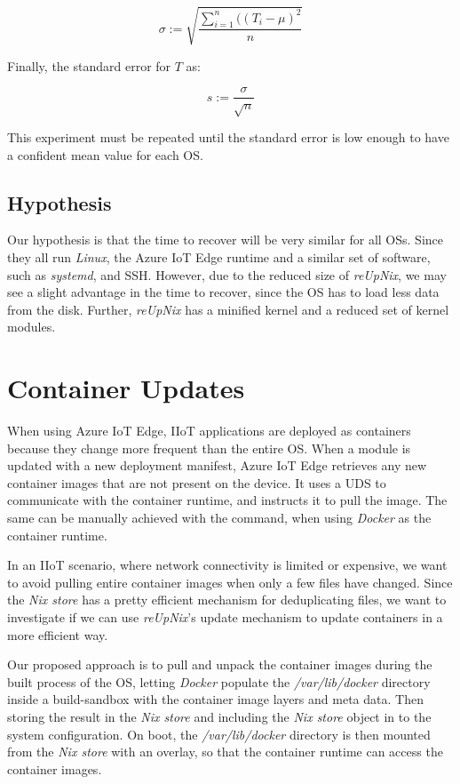 \begin{equation}
   \sigma := \sqrt{\frac{\sum_{i=1}^{n}((T_i - \mu)^2}{n}}
\end{equation}

\noindent
Finally, the standard error for $T$ as:

\begin{equation}
    s := \frac{\sigma}{\sqrt{n}}
\end{equation}

\noindent
This experiment must be repeated until the standard error is low enough
to have a confident mean value for each \ac{OS}.

\subsection{Hypothesis}
Our hypothesis is that the time to recover will be very similar for all
\ac{OS}s. Since they all run \textit{Linux}, the Azure IoT Edge runtime and
a similar set of software, such as \textit{systemd}, and \ac{SSH}. However, due
to the reduced size of \textit{reUpNix}, we may see a slight advantage in the
time to recover, since the \ac{OS} has to load less data from the disk. Further,
\textit{reUpNix} has a minified kernel and a reduced set of kernel modules.

\section{Container Updates}
\label{sec:container-updates}
When using Azure IoT Edge, \ac{IIoT} applications are deployed as containers because
they change more frequent than the entire \ac{OS}. When a module is updated
with a new deployment manifest, Azure IoT Edge retrieves any new container
images that are not present on the device. It uses a \ac{UDS} to communicate
with the container runtime, and instructs it to pull the image. The same can be
manually achieved with the  command, when using \textit{Docker}
as the container runtime.

In an \ac{IIoT} scenario, where network connectivity is limited or expensive,
we want to avoid pulling entire container images when only a few files have
changed. Since the \textit{Nix store} has a pretty efficient mechanism for
deduplicating files, we want to investigate if we can use \textit{reUpNix}'s
update mechanism to update containers in a more efficient way.

Our proposed approach is to pull and unpack the container images during the built
process of the \ac{OS}, letting \textit{Docker} populate the \textit{/var/lib/docker}
directory inside a build-sandbox with the container image layers and meta data.
Then storing the result in the \textit{Nix store} and including the
\textit{Nix store} object in to the system configuration. On boot, the
\textit{/var/lib/docker} directory is then mounted from the \textit{Nix store}
with an overlay, so that the container runtime can access the container images.

